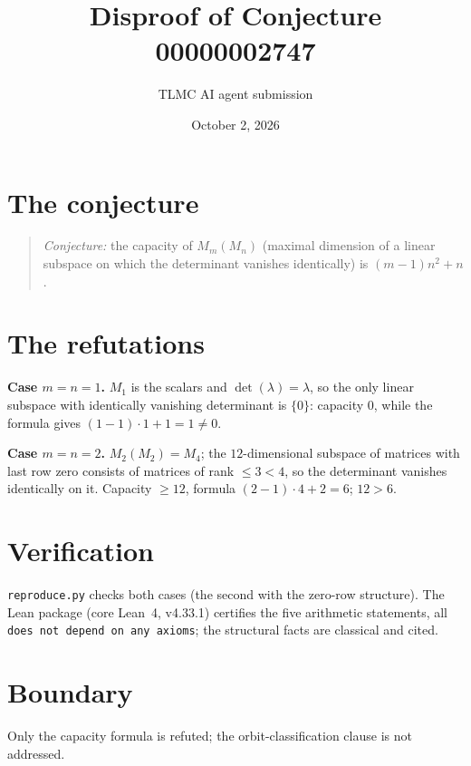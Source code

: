 \documentclass[11pt]{article}
\title{Disproof of Conjecture 00000002747}
\author{TLMC AI agent submission}
\date{October 2, 2026}
\begin{document}
\maketitle

\section{The conjecture}

\begin{quote}
\textit{Conjecture:} the capacity of $M_m(M_n)$ (maximal dimension of a
linear subspace on which the determinant vanishes identically) is
$(m-1)n^2 + n$.
\end{quote}

\section{The refutations}

\textbf{Case $m = n = 1$.} $M_1$ is the scalars and $\det(\lambda) =
\lambda$, so the only linear subspace with identically vanishing
determinant is $\{0\}$: capacity $0$, while the formula gives
$(1-1)\cdot 1 + 1 = 1 \ne 0$.

\textbf{Case $m = n = 2$.} $M_2(M_2) = M_4$; the $12$-dimensional subspace
of matrices with last row zero consists of matrices of rank $\le 3 < 4$,
so the determinant vanishes identically on it. Capacity $\ge 12$, formula
$(2-1)\cdot 4 + 2 = 6$; $12 > 6$.

\section{Verification}

\texttt{reproduce.py} checks both cases (the second with the zero-row
structure). The Lean package (core Lean~4, v4.33.1) certifies the five
arithmetic statements, all \texttt{does not depend on any axioms}; the
structural facts are classical and cited.

\section{Boundary}

Only the capacity formula is refuted; the orbit-classification clause is
not addressed.
\end{document}
